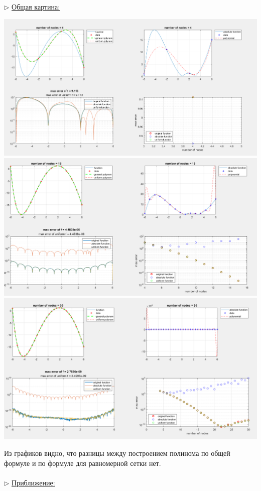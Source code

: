 \documentclass{article}
\begin{document}
	$\triangleright$ \underline{Общая картина:}
	\begin{center}
		\includegraphics[scale = 0.4]{Графики1}
		\includegraphics[scale = 0.419]{Графики2}
		\includegraphics[scale = 0.4]{Графики3}
	\end{center}
	Из графиков видно, что разницы между построением полинома по общей формуле и по формуле для равномерной сетки нет.\\
	\\
	$\triangleright$ \underline{Приближение:}\\
\end{document}
